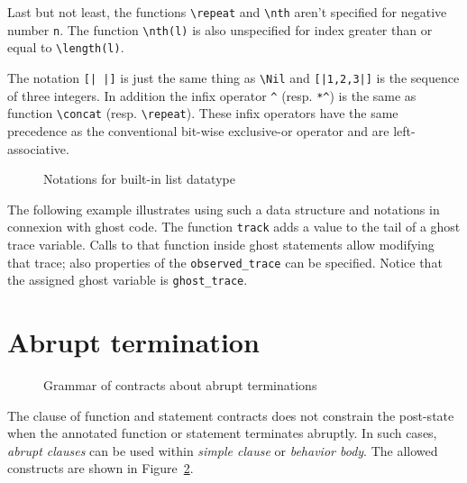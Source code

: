 Last but not least, the functions \lstinline|\repeat| and \lstinline|\nth| 
aren't specified for negative number \lstinline|n|. 
The function \lstinline|\nth(l)| is also unspecified for index greater than or 
equal to \lstinline|\length(l)|.

The notation \lstinline![| |]! is just the same thing as \lstinline|\Nil| and
\lstinline![|1,2,3|]! is the sequence of three integers.
In addition the infix operator \lstinline|^| (resp. \lstinline|*^|) 
is the same as function \lstinline|\concat| (resp. \lstinline|\repeat|).
These infix operators have the same precedence as the conventional bit-wise exclusive-or operator
and are left-associative.

\begin{figure}[t]
  \begin{cadre}
      
    \end{cadre}
  \caption{Notations for built-in list datatype}
\label{fig:gram:list}
\end{figure}

\begin{example}
  The following example illustrates using such a data structure and 
  notations in connexion with ghost code.
  The function \lstinline|track| adds a value to the tail of a ghost trace variable. 
  Calls to that function inside ghost statements allow modifying that trace; 
  also properties of the \lstinline|observed_trace| can be specified. 
  Notice that the assigned ghost variable is \lstinline|ghost_trace|.
\end{example}


\section{Abrupt termination}
\label{sec:abrupt-clause}

\begin{figure}[t]
  \begin{cadre}
     
    \end{cadre}
    \caption{Grammar of contracts about abrupt terminations}
  \label{fig:gram:abrupt-clauses}
\end{figure}

The \ensures{} clause of function and statement contracts
does not constrain the post-state when the annotated function or
statement terminates abruptly. In such cases,
\textsl{abrupt clauses} can be used within \textsl{simple clause} or
\textsl{behavior body}. The allowed constructs are shown in
Figure~\ref{fig:gram:abrupt-clauses}.

